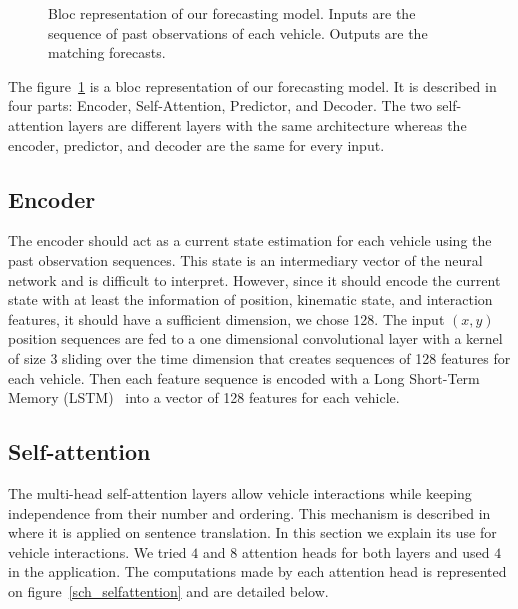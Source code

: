 \documentclass[a4paper, 10pt, conference]{ieeeconf}      %
\begin{document}
\begin{figure}[ht]
    \caption{Bloc representation of our forecasting model.
    Inputs are the sequence of past observations of each vehicle.
    Outputs are the matching forecasts.}
    \label{sch_whole_model}

\end{figure}

The figure~\ref{sch_whole_model} is a bloc representation of our forecasting model.
It is described in four parts: Encoder, Self-Attention, Predictor, and Decoder.
The two self-attention layers are different layers with the same architecture whereas the
encoder, predictor, and decoder are the same for every input.

\subsection{Encoder}

The encoder should act as a current state estimation for each vehicle using the past observation sequences.
This state is an intermediary vector of the neural network and is difficult to interpret.
However, since it should encode the current state with at least the information of position, kinematic state,
and interaction features, it should have a sufficient dimension, we chose 128.
The input $(x, y)$ position sequences are fed to a one dimensional convolutional layer with a kernel
of size 3 sliding over the time dimension that creates sequences of 128 features for each vehicle.
Then each feature sequence is encoded with a Long Short-Term Memory (LSTM)~\cite{Hochreiter1997}
into a vector of 128 features for each vehicle.


\subsection{Self-attention}
\label{sec_self_attention}


The multi-head self-attention layers allow vehicle interactions while keeping independence from their number
and ordering.
This mechanism is described in~\cite{Vaswani2017} where it is applied on sentence translation.
In this section we explain its use for vehicle interactions.
We tried $4$ and $8$ attention heads for both layers and used $4$ in the application.
The computations made by each attention head is represented on figure~\ref{sch_selfattention} and are detailed below.
\end{document}
